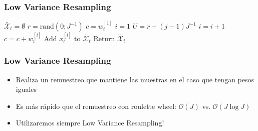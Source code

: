 \begin{frame}
    \frametitle{Low Variance Resampling}

    \begin{algorithmic}[1]
        \State $\bar{\mathcal{X}}_t = \emptyset$
        \State $r = \text{rand}(0; J^{-1})$
        \State $c = w_t^{[1]}$
        \State $i = 1$
            \State $U = r + (j - 1)  J^{-1}$
                \State $i = i + 1$
                \State $c = c + w_t^{[i]}$
            \EndWhile
            \State Add $x_t^{[i]}$ to $\bar{\mathcal{X}}_t$
        \EndFor
        \State Return $\bar{\mathcal{X}}_t$
        \EndProcedure
    \end{algorithmic}


\end{frame}

\begin{frame}
    \frametitle{Low Variance Resampling}
    \begin{itemize}
        \item Realiza un remuestreo que mantiene las muestras en el caso que tengan pesos iguales
        \item Es más rápido que el remuestreo con roulette wheel: $\mathcal{O}(J)$ vs. $\mathcal{O}(J \log J)$
        \item \alert{Utilizaremos siempre Low Variance Resampling!}
    \end{itemize}
\end{frame}


